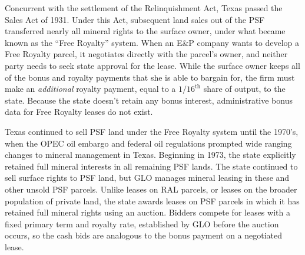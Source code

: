 Concurrent with the settlement of the Relinquishment Act, Texas passed the Sales Act of 1931. Under this Act, subsequent land sales out of the PSF transferred nearly all mineral rights to the surface owner, under what became known as the ``Free Royalty'' system.  When an E\&P company wants to develop a Free Royalty parcel, it negotiates directly with the parcel's owner, and neither party needs to seek state approval for the lease.  While the surface owner keeps all of the bonus and royalty payments that she is able to bargain for, the firm must make an \textit{additional} royalty payment, equal to a $1/16^{\text{th}}$ share of output, to the state.  Because the state doesn't retain any bonus interest, administrative bonus data for Free Royalty leases do not exist. 

Texas continued to sell PSF land under the Free Royalty system until the 1970's, when the OPEC oil embargo and federal oil regulations prompted wide ranging changes to mineral management in Texas. Beginning in 1973, the state explicitly retained full mineral interests in all remaining PSF lands.  The state continued to sell surface rights to PSF land, but GLO manages mineral leasing in these and other unsold PSF parcels. Unlike leases on RAL parcels, or leases on the broader population of private land, the state awards leases on PSF parcels in which it has retained full mineral rights using an auction. Bidders compete for leases with a fixed primary term and royalty rate, established by GLO before the auction occurs, so the cash bids are analogous to the bonus payment on a negotiated lease. 

